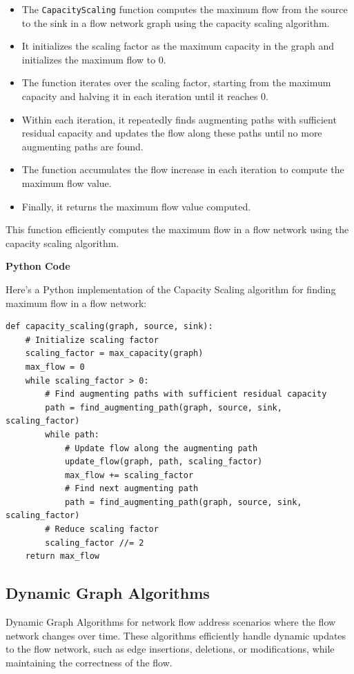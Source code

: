 \documentclass[12pt]{book} %
\begin{document}
\begin{itemize}
    \item The \texttt{CapacityScaling} function computes the maximum flow from the source to the sink in a flow network graph using the capacity scaling algorithm.
    \item It initializes the scaling factor as the maximum capacity in the graph and initializes the maximum flow to 0.
    \item The function iterates over the scaling factor, starting from the maximum capacity and halving it in each iteration until it reaches 0.
    \item Within each iteration, it repeatedly finds augmenting paths with sufficient residual capacity and updates the flow along these paths until no more augmenting paths are found.
    \item The function accumulates the flow increase in each iteration to compute the maximum flow value.
    \item Finally, it returns the maximum flow value computed.
\end{itemize}

This function efficiently computes the maximum flow in a flow network using the capacity scaling algorithm.

\textbf{Python Code}


Here's a Python implementation of the Capacity Scaling algorithm for finding maximum flow in a flow network:
\FloatBarrier
\begin{lstlisting}
def capacity_scaling(graph, source, sink):
    # Initialize scaling factor
    scaling_factor = max_capacity(graph)
    max_flow = 0
    while scaling_factor > 0:
        # Find augmenting paths with sufficient residual capacity
        path = find_augmenting_path(graph, source, sink, scaling_factor)
        while path:
            # Update flow along the augmenting path
            update_flow(graph, path, scaling_factor)
            max_flow += scaling_factor
            # Find next augmenting path
            path = find_augmenting_path(graph, source, sink, scaling_factor)
        # Reduce scaling factor
        scaling_factor //= 2
    return max_flow
\end{lstlisting}
\FloatBarrier

\subsection{Dynamic Graph Algorithms}

Dynamic Graph Algorithms for network flow address scenarios where the flow network changes over time. These algorithms efficiently handle dynamic updates to the flow network, such as edge insertions, deletions, or modifications, while maintaining the correctness of the flow.
\end{document}
